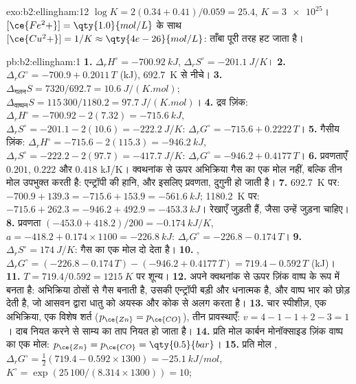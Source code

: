 \begin{solution}{exo:b2:ellingham:12}
$\log K = 2(0.34 + 0.41)/0.059 = 25.4$, $K = \num{3e25}$। $[\ce{Fe^2+}] = \qty{1.0}{mol/L}$
के साथ $[\ce{Cu^2+}] = 1/K \approx
\qty{4e-26}{mol/L}$: ताँबा पूरी तरह हट जाता है।
\end{solution}

\begin{solution}{pb:b2:ellingham:1}
\textbf{1.} $\Delta_r H^\circ = \qty{-700.92}{kJ}$, $\Delta_r S^\circ =
\qty{-201.1}{J/K}$।
\textbf{2.} $\Delta_r G^\circ = -700.9 + 0.2011\,T$ (\unit{kJ}),
\qty{692.7}{K} से नीचे।
\textbf{3.} $\Delta_{\text{गलन}}S = 7320/692.7 = \qty{10.6}{J/(K.mol)}$;
$\Delta_{\text{वाष्पन}}S = 115\,300/1180.2 = \qty{97.7}{J/(K.mol)}$।
\textbf{4.} द्रव ज़िंक: $\Delta_r H^\circ = -700.92 - 2(7.32) = \qty{-715.6}{kJ}$,
$\Delta_r S^\circ = -201.1 - 2(10.6) = \qty{-222.2}{J/K}$: $\Delta_r G^\circ =
-715.6 + 0.2222\,T$।
\textbf{5.} गैसीय ज़िंक: $\Delta_r H^\circ = -715.6 - 2(115.3) = \qty{-946.2}{kJ}$,
$\Delta_r S^\circ = -222.2 - 2(97.7) = \qty{-417.7}{J/K}$: $\Delta_r G^\circ =
-946.2 + 0.4177\,T$।
\textbf{6.} प्रवणताएँ $0.201$, $0.222$ और $0.418$ \unit{kJ/K}। क्वथनांक से ऊपर
अभिक्रिया गैस का एक मोल नहीं, बल्कि तीन मोल उपभुक्त करती है: एन्ट्रॉपी की
हानि, और इसलिए प्रवणता, दुगुनी हो जाती है।
\textbf{7.} \qty{692.7}{K} पर: $-700.9 + 139.3 = -715.6 + 153.9 = \qty{-561.6}{kJ}$;
\qty{1180.2}{K} पर: $-715.6 + 262.3 = -946.2 + 492.9 = \qty{-453.3}{kJ}$।
रेखाएँ जुड़ती हैं, जैसा उन्हें जुड़ना चाहिए।
\textbf{8.} प्रवणता $(-453.0 + 418.2)/200 = \qty{-0.174}{kJ/K}$, $a = -418.2 +
0.174 \times 1100 = \qty{-226.8}{kJ}$: $\Delta_r G^\circ = -226.8 - 0.174\,T$।
\textbf{9.} $\Delta_r S^\circ = \qty{+174}{J/K}$: गैस का एक मोल दो देता है।
\textbf{10.} , $\Delta_r G^\circ = (-226.8 - 0.174\,T)
- (-946.2 + 0.4177\,T) = 719.4 - 0.592\,T$ (\unit{kJ})।
\textbf{11.} $T = 719.4/0.592 = \qty{1215}{K}$ पर शून्य।
\textbf{12.} अपने क्वथनांक से ऊपर ज़िंक वाष्प के रूप में बनता है: अभिक्रिया
ठोसों से गैस बनाती है, उसकी एन्ट्रॉपी बड़ी और धनात्मक है, और वाष्प
भार को छोड़ देती है, जो आसवन द्वारा धातु को अयस्क और कोक से अलग करता है।
\textbf{13.} चार स्पीशीज़, एक अभिक्रिया, एक विशेष शर्त ($p_{\ce{Zn}} =
p_{\ce{CO}}$), तीन प्रावस्थाएँ: $v = 4 - 1 - 1 + 2 - 3 = 1$। दाब नियत करने से
साम्य का ताप नियत हो जाता है।
\textbf{14.} प्रति मोल कार्बन मोनॉक्साइड ज़िंक वाष्प का एक मोल:
$p_{\ce{Zn}} = p_{\ce{CO}} = \qty{0.5}{bar}$।
\textbf{15.} प्रति मोल , $\Delta_r G^\circ = \frac12(719.4 - 0.592 \times
1300) = \qty{-25.1}{kJ/mol}$, $K^\circ = \exp(25\,100/(8.314 \times 1300)) = 10$;

\end{solution}

